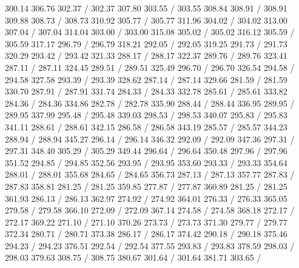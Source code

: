 { 300.14 306.76 302.37 /
 302.37 307.80 303.55 /
 303.55 308.84 308.91 /
 308.91 309.88 308.73 /
 308.73 310.92 305.77 /
 305.77 311.96 304.02 /
 304.02 313.00 307.04 /
 307.04 314.04 303.00 /
 303.00 315.08 305.02 /
 305.02 316.12 305.59 /
 305.59 317.17 296.79 /
 296.79 318.21 292.05 /
 292.05 319.25 291.73 /
 291.73 320.29 293.42 /
 293.42 321.33 288.17 /
 288.17 322.37 289.76 /
 289.76 323.41 287.11 /
 287.11 324.45 289.51 /
 289.51 325.49 296.70 /
 296.70 326.54 294.58 /
 294.58 327.58 293.39 /
 293.39 328.62 287.14 /
 287.14 329.66 281.59 /
 281.59 330.70 287.91 /
 287.91 331.74 284.33 /
 284.33 332.78 285.61 /
 285.61 333.82 284.36 /
 284.36 334.86 282.78 /
 282.78 335.90 288.44 /
 288.44 336.95 289.95 /
 289.95 337.99 295.48 /
 295.48 339.03 298.53 /
 298.53 340.07 295.83 /
 295.83 341.11 288.61 /
 288.61 342.15 286.58 /
 286.58 343.19 285.57 /
 285.57 344.23 288.94 /
 288.94 345.27 296.14 /
 296.14 346.32 292.09 /
 292.09 347.36 297.31 /
 297.31 348.40 305.29 /
 305.29 349.44 296.64 /
 296.64 350.48 297.96 /
 297.96 351.52 294.85 /
 294.85 352.56 293.95 /
 293.95 353.60 293.33 /
 293.33 354.64 288.01 /
 288.01 355.68 284.65 /
 284.65 356.73 287.13 /
 287.13 357.77 287.83 /
 287.83 358.81 281.25 /
 281.25 359.85 277.87 /
 277.87 360.89 281.25 /
 281.25 361.93 286.13 /
 286.13 362.97 274.92 /
 274.92 364.01 276.33 /
 276.33 365.05 279.58 /
 279.58 366.10 272.09 /
 272.09 367.14 274.58 /
 274.58 368.18 272.17 /
 272.17 369.22 271.10 /
 271.10 370.26 273.73 /
 273.73 371.30 279.77 /
 279.77 372.34 280.71 /
 280.71 373.38 286.17 /
 286.17 374.42 290.18 /
 290.18 375.46 294.23 /
 294.23 376.51 292.54 /
 292.54 377.55 293.83 /
 293.83 378.59 298.03 /
 298.03 379.63 308.75 /
 308.75 380.67 301.64 /
 301.64 381.71 303.65 /
}
